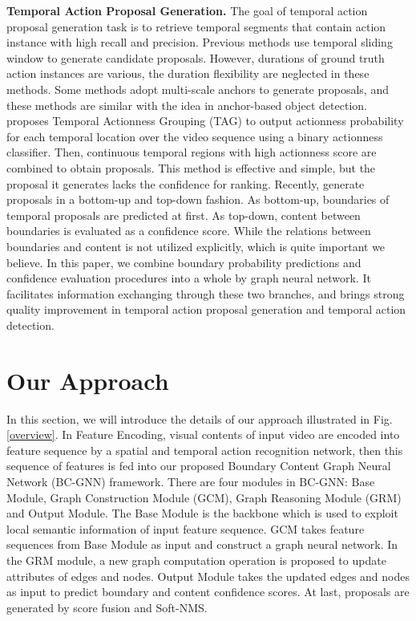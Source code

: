 \documentclass[runningheads]{llncs}
\begin{document}
\noindent\textbf{Temporal Action Proposal Generation.}
The goal of temporal action proposal generation task is to retrieve temporal segments that contain action instance with high recall and precision. Previous methods \cite{wang2014action,oneata2014lear} use temporal sliding window to generate candidate proposals. However, durations of ground truth action instances are various, the duration flexibility are neglected in these methods. Some methods  \cite{SST,sw2,sw3,SSAD} adopt multi-scale anchors to generate proposals, and these methods are similar with the idea in anchor-based object detection. \cite{TAG} proposes Temporal Actionness Grouping (TAG) to output actionness probability for each temporal location over the video sequence using a binary actionness classifier. Then, continuous temporal regions with high actionness score are combined to obtain proposals. This method is effective and simple, but the proposal it generates lacks the confidence for ranking. Recently, \cite{BSN,BMN} generate proposals in a bottom-up and top-down fashion. As bottom-up, boundaries of temporal proposals are predicted at first. As top-down, content between boundaries is evaluated as a confidence score. While the relations between boundaries and content is not utilized explicitly, which is quite important we believe. In this paper, we combine boundary probability predictions and confidence evaluation procedures into a whole by graph neural network. It facilitates information exchanging through these two branches, and brings strong quality improvement in temporal action proposal generation and temporal action detection.



\section{Our Approach}
In this section, we will introduce the details of our approach illustrated in Fig.\ref{overview}. In Feature Encoding, visual contents of input video are encoded into feature sequence by a spatial and temporal action recognition network, then this sequence of features is fed into our proposed Boundary Content Graph Neural Network (BC-GNN) framework. There are four modules in BC-GNN: Base Module, Graph Construction Module (GCM), Graph Reasoning Module (GRM) and Output Module. The Base Module is the backbone which is used to exploit local semantic information of input feature sequence. GCM takes feature sequences from Base Module as input and construct a graph neural network. In the GRM module, a new graph computation operation is proposed to update attributes of edges and nodes. Output Module takes the updated edges and nodes as input to predict boundary and content confidence scores. At last, proposals are generated by score fusion and Soft-NMS.
\end{document}
